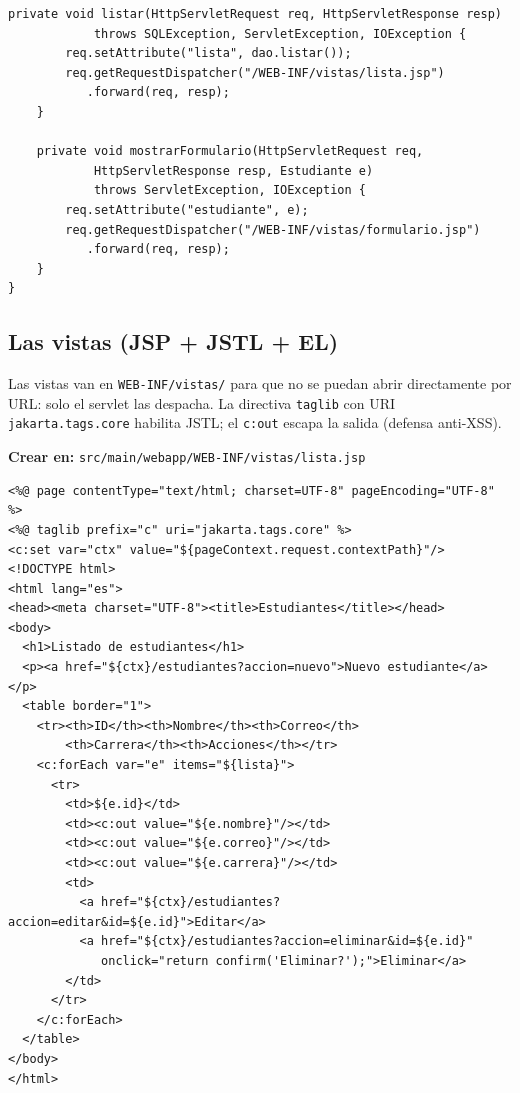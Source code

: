 \documentclass[11pt,a4paper,openany]{book}
\begin{document}
\begin{lstlisting}[style=java,caption={EstudianteServlet.java (control de la peticion)},label={lst:jsp-servlet}]
    private void listar(HttpServletRequest req, HttpServletResponse resp)
            throws SQLException, ServletException, IOException {
        req.setAttribute("lista", dao.listar());
        req.getRequestDispatcher("/WEB-INF/vistas/lista.jsp")
           .forward(req, resp);
    }

    private void mostrarFormulario(HttpServletRequest req,
            HttpServletResponse resp, Estudiante e)
            throws ServletException, IOException {
        req.setAttribute("estudiante", e);
        req.getRequestDispatcher("/WEB-INF/vistas/formulario.jsp")
           .forward(req, resp);
    }
}
\end{lstlisting}

\subsection{Las vistas (JSP + JSTL + EL)}
\label{ap:crud:jsp:vistas}

Las vistas van en \texttt{WEB-INF/vistas/} para que no se puedan abrir
directamente por URL: solo el servlet las despacha. La directiva
\texttt{taglib} con URI \texttt{jakarta.tags.core} habilita JSTL; el
\texttt{c:out} escapa la salida (defensa anti-XSS).

{\small\textbf{Crear en:} \texttt{src/main/webapp/WEB-INF/vistas/lista.jsp}}
\begin{lstlisting}[style=html,caption={lista.jsp (listado con JSTL y EL)},label={lst:jsp-lista}]
<%@ page contentType="text/html; charset=UTF-8" pageEncoding="UTF-8" %>
<%@ taglib prefix="c" uri="jakarta.tags.core" %>
<c:set var="ctx" value="${pageContext.request.contextPath}"/>
<!DOCTYPE html>
<html lang="es">
<head><meta charset="UTF-8"><title>Estudiantes</title></head>
<body>
  <h1>Listado de estudiantes</h1>
  <p><a href="${ctx}/estudiantes?accion=nuevo">Nuevo estudiante</a></p>
  <table border="1">
    <tr><th>ID</th><th>Nombre</th><th>Correo</th>
        <th>Carrera</th><th>Acciones</th></tr>
    <c:forEach var="e" items="${lista}">
      <tr>
        <td>${e.id}</td>
        <td><c:out value="${e.nombre}"/></td>
        <td><c:out value="${e.correo}"/></td>
        <td><c:out value="${e.carrera}"/></td>
        <td>
          <a href="${ctx}/estudiantes?accion=editar&id=${e.id}">Editar</a>
          <a href="${ctx}/estudiantes?accion=eliminar&id=${e.id}"
             onclick="return confirm('Eliminar?');">Eliminar</a>
        </td>
      </tr>
    </c:forEach>
  </table>
</body>
</html>
\end{lstlisting}
\end{document}

